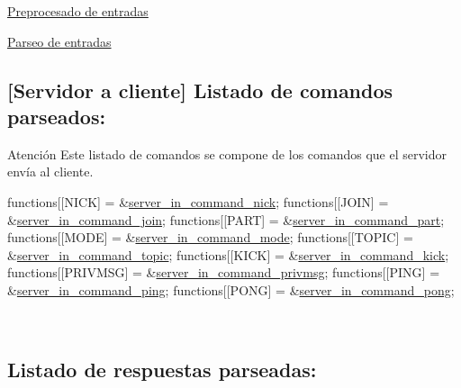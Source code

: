 \begin{DoxyItemize}
\item \hyperlink{client_pre_in_function}{Preprocesado de entradas} 
\item \hyperlink{client_execute_in_function}{Parseo de entradas} 
\end{DoxyItemize}\subsection*{\mbox{[}Servidor a cliente\mbox{]} Listado de comandos parseados\+:}

\begin{DoxyWarning}{Atención}
Este listado de comandos se compone de los comandos que el servidor envía al cliente.
\end{DoxyWarning}

\begin{DoxyCode}
functions[[NICK]             = &\hyperlink{G-2313-06-P2__client__function__handlers_8h_a3271de16b2f7077059343bd6f52e4866}{server\_in\_command\_nick};
functions[[JOIN]             = &\hyperlink{G-2313-06-P2__client__function__handlers_8h_a64c324e32edf01774722861d3abc7be3}{server\_in\_command\_join};
functions[[PART]             = &\hyperlink{G-2313-06-P2__client__function__handlers_8h_a53568ffb9d2301140815861c2f7178ad}{server\_in\_command\_part};
functions[[MODE]             = &\hyperlink{G-2313-06-P2__client__function__handlers_8h_ae5f66619469f8ea0efa0a7a5d75938dc}{server\_in\_command\_mode};
functions[[TOPIC]            = &\hyperlink{G-2313-06-P2__client__function__handlers_8h_ad908abfd32d53b9483d5afa4ca18ff14}{server\_in\_command\_topic};
functions[[KICK]             = &\hyperlink{G-2313-06-P2__client__function__handlers_8h_aa3d18c616914957b9794f086466788bb}{server\_in\_command\_kick};
functions[[PRIVMSG]          = &\hyperlink{G-2313-06-P2__client__function__handlers_8h_a32594eebe5482f63993568825a9e126a}{server\_in\_command\_privmsg};
functions[[PING]             = &\hyperlink{G-2313-06-P2__client__function__handlers_8h_a09a9d4d13037bd783036a70d5a76ac46}{server\_in\_command\_ping};
functions[[PONG]             = &\hyperlink{G-2313-06-P2__client__function__handlers_8h_a06042a6459e89e0ae7586e66f8595fa3}{server\_in\_command\_pong};
\end{DoxyCode}
 ~\newline
\subsection*{Listado de respuestas parseadas\+:}


